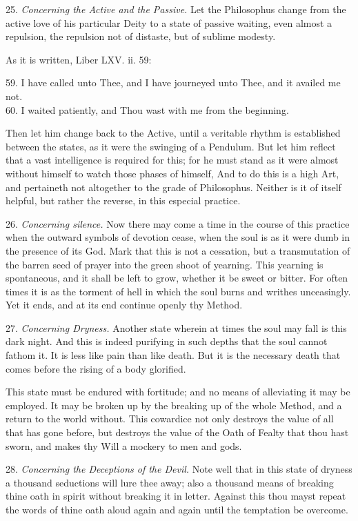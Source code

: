 25. \textit{Concerning the Active and the Passive.} Let the Philosophus change from the active love of his particular Deity to a state of passive waiting, even almost a repulsion, the repulsion not of distaste, but of sublime modesty.

As it is written, Liber LXV. ii. 59:
\begin{quoting}[indentfirst=false]
59. I have called unto Thee, and I have journeyed unto Thee, and it availed me not. \\
60. I waited patiently, and Thou wast with me from the beginning.
\end{quoting}

Then let him change back to the Active, until a veritable rhythm is established between the states, as it were the swinging of a Pendulum. But let him reflect that a vast intelligence is required for this; for he must stand as it were almost without himself to watch those phases of himself, And to do this is a high Art, and pertaineth not altogether to the grade of Philosophus. Neither is it of itself helpful, but rather the reverse, in this especial practice.

26. \textit{Concerning silence.} Now there may come a time in the course of this practice when the outward symbols of devotion cease, when the soul is as it were dumb in the presence of its God. Mark that this is not a cessation, but a transmutation of the barren seed of prayer into the green shoot of yearning. This yearning is spontaneous, and it shall be left to grow, whether it be sweet or bitter. For often times it is as the torment of hell in which the soul burns and writhes unceasingly. Yet it ends, and at its end continue openly thy Method.

27. \textit{Concerning Dryness.} Another state wherein at times the soul may fall is this dark night. And this is indeed purifying in such depths that the soul cannot fathom it. It is less like pain than like death. But it is the necessary death that comes before the rising of a body glorified.

This state must be endured with fortitude; and no means of alleviating it may be employed. It may be broken up by the breaking up of the whole Method, and a return to the world without. This cowardice not only destroys the value of all that has gone before, but destroys the value of the Oath of Fealty that thou hast sworn, and makes thy Will a mockery to men and gods.

28. \textit{Concerning the Deceptions of the Devil.} Note well that in this state of dryness a thousand seductions will lure thee away; also a thousand means of breaking thine oath in spirit without breaking it in letter. Against this thou mayst repeat the words of thine oath aloud again and again until the temptation be overcome.

